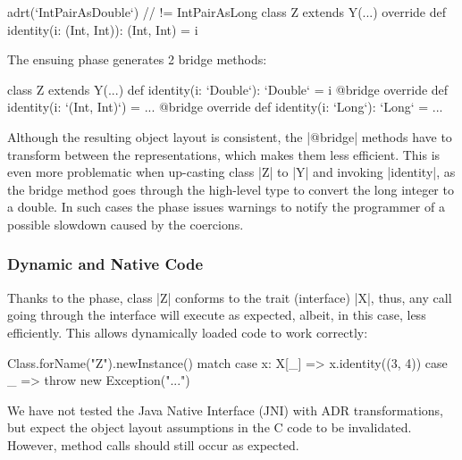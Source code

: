 \begin{lstlisting-nobreak}
adrt(`IntPairAsDouble`) { // != IntPairAsLong
  class Z extends Y(...) {
    override def identity(i: (Int, Int)): (Int, Int) = i
  }
}
\end{lstlisting-nobreak}

The ensuing \bridge{} phase generates 2 bridge methods: %

\begin{lstlisting-nobreak}
class Z extends Y(...) {
  def identity(i: `Double`): `Double` = i
  @bridge override def identity(i: `(Int, Int)`) = ...
  @bridge override def identity(i: `Long`): `Long` = ...
}
\end{lstlisting-nobreak}


Although the resulting object layout is consistent, the |@bridge| methods have to transform between the representations, which makes them less efficient. This is even more problematic when up-casting class |Z| to |Y| and invoking |identity|, as the bridge method goes through the high-level type to convert the long integer to a double. In such cases the \bridge{} phase issues warnings to notify the programmer of a possible slowdown caused by the coercions.

\subsubsection{Dynamic and Native Code}
\label{sec:ildl:language-dynamically-loaded-code}

Thanks to the \bridge{} phase, class |Z| conforms to the trait (interface) |X|, thus, any call going through the interface will execute as expected, albeit, in this case, less efficiently.
This allows dynamically loaded code to work correctly:

\begin{lstlisting-nobreak}
Class.forName("Z").newInstance() match {
  case x: X[_] => x.identity((3, 4))
  case _ => throw new Exception("...")
}
\end{lstlisting-nobreak}

We have not tested the Java Native Interface (JNI) with ADR transformations, but expect the object layout assumptions in the C code to be invalidated. However, method calls should still occur as expected.

